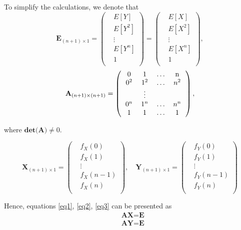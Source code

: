 To simplify the calculations, we denote that
\[
    \textbf{E}_{(n+1)\times1}=\left(
    \begin{aligned}
        &E[Y]\\
        &E[Y^2]\\
        &\vdots\\
        &E[Y^n]\\
        &1\\
    \end{aligned}
    \right)
    =
    \left(
    \begin{aligned}
        &E[X]\\
        &E[X^2]\\
        &\vdots\\
        &E[X^n]\\
        &1\\
    \end{aligned}
    \right),
\]
\[ 
    \textbf{A}_{(n+1)\times(n+1)}=\left(
    \begin{tabular}{cccc}
        0 & 1 & $\hdots$ & n\\
        $0^2$ & $1^2$ & $\hdots$ & $n^2$\\
        &$\vdots$&&\\
        $0^n$ & $1^n$ & $\hdots$ & $n^n$\\
        1 & 1 & $\hdots$ & 1\\
    \end{tabular}
    \right),
\]

where $\textbf{det(A)}\neq0$.

\[
    \textbf{X}_{(n+1)\times1}=\left(
    \begin{aligned}
        &f_X(0)\\
        &f_X(1)\\
        &\vdots\\
        &f_X(n-1)\\
        &f_X(n)\\
    \end{aligned}
    \right),\quad
    \textbf{Y}_{(n+1)\times1}=
    \left(
    \begin{aligned}
        &f_Y(0)\\
        &f_Y(1)\\
        &\vdots\\
        &f_Y(n-1)\\
        &f_Y(n)\\
    \end{aligned}
    \right)
\]

Hence, equations \ref{eq1}, \ref{eq2}, \ref{eq3} can be presented as
\begin{equation}\label{eq4}
\begin{split}
    &\textbf{A}\textbf{X}=\textbf{E}\\
    &\textbf{A}\textbf{Y}=\textbf{E} 
\end{split}
\end{equation}

